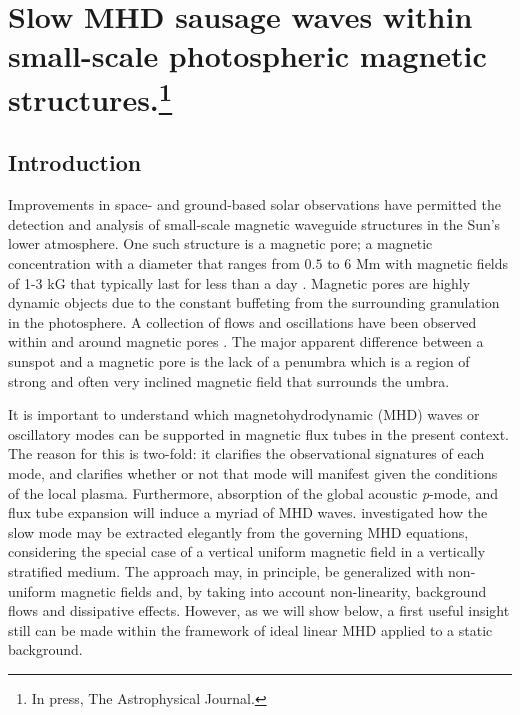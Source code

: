 \graphicspath{{Chapter4/Figs/}}

\chapter[Slow MHD sausage waves]{Slow MHD sausage waves within small-scale photospheric magnetic structures.\footnote{In press, The Astrophysical Journal.}}
\label{chapter4}

   \vspace*{\fill}\par
   \pagebreak

\section{Introduction}
\label{Intro}
    
    Improvements in space- and ground-based solar observations have permitted the detection and analysis of small-scale magnetic waveguide structures in the Sun's lower atmosphere.
    One such structure is a magnetic pore; a magnetic concentration with a diameter that ranges from $0.5$ to $6$ Mm with magnetic fields of 1-3 kG that typically last for less than a day \citep{1970SoPh...13...85S}.
    Magnetic pores are highly dynamic objects due to the constant buffeting from the surrounding granulation in the photosphere.
    A collection of flows and oscillations have been observed within and around magnetic pores \citep{1999SoPh..187..389B,2002A&A...383..275H,2002A&A...395..249R,doretalb,SAO,Dorotovic2014,freij2014,jess2015multiwavelength,2015A&A...579A..73M}.
    The major apparent difference between a sunspot and a magnetic pore is the lack of a penumbra which is a region of strong and often very inclined magnetic field that surrounds the umbra. 
    
    It is important to understand which magnetohydrodynamic (MHD) waves or oscillatory modes can be supported in magnetic flux tubes in the present context.
    The reason for this is two-fold: it clarifies the observational signatures of each mode, and clarifies whether or not that mode will manifest given the conditions of the local plasma. 
    Furthermore, absorption of the global acoustic \textit{p}-mode, and flux tube expansion will induce a myriad of MHD waves.	
    \citet{roberts} investigated how the slow mode may be extracted elegantly from the governing MHD equations, considering the special case of a vertical uniform magnetic field in a vertically stratified medium.
    The approach may, in principle, be generalized with non-uniform magnetic fields \citep{luna-cardozo} and, by taking into account non-linearity, background flows and dissipative effects.
    However, as we will show below, a first useful insight still can be made within the framework of ideal linear MHD applied to a static background.
    
